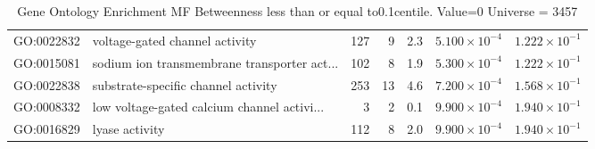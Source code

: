 \begin{table}[ht]
\begin{tabular}{llrrrrr}
  GO:0022832 & voltage-gated channel activity & 127 & 9 & 2.3 & $5.100 \times 10^{-4}$ & $1.222 \times 10^{-1}$ \\ 
  GO:0015081 & sodium ion transmembrane transporter act... & 102 & 8 & 1.9 & $5.300 \times 10^{-4}$ & $1.222 \times 10^{-1}$ \\ 
  GO:0022838 & substrate-specific channel activity & 253 & 13 & 4.6 & $7.200 \times 10^{-4}$ & $1.568 \times 10^{-1}$ \\ 
  GO:0008332 & low voltage-gated calcium channel activi... & 3 & 2 & 0.1 & $9.900 \times 10^{-4}$ & $1.940 \times 10^{-1}$ \\ 
  GO:0016829 & lyase activity & 112 & 8 & 2.0 & $9.900 \times 10^{-4}$ & $1.940 \times 10^{-1}$ \\ 
   \hline
\end{tabular}
\caption{Gene Ontology Enrichment MF Betweenness  less than or equal to0.1centile.   Value=0 Universe = 3457} 
\label{tab:Gene Ontology Enrichment MF Betweenness  less than or equal to0.1centile.   Value=0 Universe = 3457}

\end{table}

